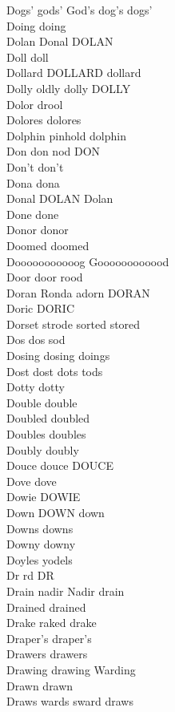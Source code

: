 Dogs' gods' God's dog's dogs'\\
Doing doing\\
Dolan Donal DOLAN\\
Doll doll\\
Dollard DOLLARD dollard\\
Dolly oldly dolly DOLLY\\
Dolor drool\\
Dolores dolores\\
Dolphin pinhold dolphin\\
Don don nod DON\\
Don't don't\\
Dona dona\\
Donal DOLAN Dolan\\
Done done\\
Donor donor\\
Doomed doomed\\
Dooooooooooog Goooooooooood\\
Door door rood\\
Doran Ronda adorn DORAN\\
Doric DORIC\\
Dorset strode sorted stored\\
Dos dos sod\\
Dosing dosing doings\\
Dost dost dots tods\\
Dotty dotty\\
Double double\\
Doubled doubled\\
Doubles doubles\\
Doubly doubly\\
Douce douce DOUCE\\
Dove dove\\
Dowie DOWIE\\
Down DOWN down\\
Downs downs\\
Downy downy\\
Doyles yodels\\
Dr rd DR\\
Drain nadir Nadir drain\\
Drained drained\\
Drake raked drake\\
Draper's draper's\\
Drawers drawers\\
Drawing drawing Warding\\
Drawn drawn\\
Draws wards sward draws\\
